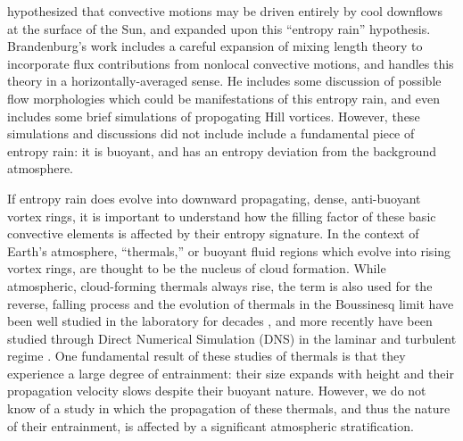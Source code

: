 \documentclass[twocolumn, amsmath, amsfonts, amssymb, trackchanges]{aastex62}
\begin{document}
\cite{spruit1997} hypothesized that convective motions may be driven entirely by cool downflows at the surface of the Sun, and \citet{brandenburg2016} expanded upon this ``entropy rain'' hypothesis. 
Brandenburg's work includes a careful expansion of mixing length theory to incorporate flux contributions from nonlocal convective motions, and handles this theory in a horizontally-averaged sense.
He includes some discussion of possible flow morphologies which could be manifestations of this entropy rain, and even includes some brief simulations of propogating Hill vortices. 
However, these simulations and discussions did not include include a fundamental piece of entropy rain: it is buoyant, and has an entropy deviation from the background atmosphere.

If entropy rain does evolve into downward propagating, dense, anti-buoyant vortex rings, it is important to understand how the filling factor of these basic convective elements is affected by their entropy signature. 
In the context of Earth's atmosphere, ``thermals,'' or buoyant fluid regions which evolve into rising vortex rings, are thought to be the nucleus of cloud formation. 
While atmospheric, cloud-forming thermals always rise, the term is also used for the reverse, falling process and the evolution of thermals in the Boussinesq limit have been well studied in the laboratory for decades \citep[see e.g.][]{morton&all1956, scorer1957}, and more recently have been studied through Direct Numerical Simulation (DNS) in the laminar and turbulent regime \citep{lecoanet&jeevanjee2018}. 
One fundamental result of these studies of thermals is that they experience a large degree of entrainment: their size expands with height and their propagation velocity slows despite their buoyant nature.
However, we do not know of a study in which the propagation of these thermals, and thus the nature of their entrainment, is affected by a significant atmospheric stratification.
\end{document}
